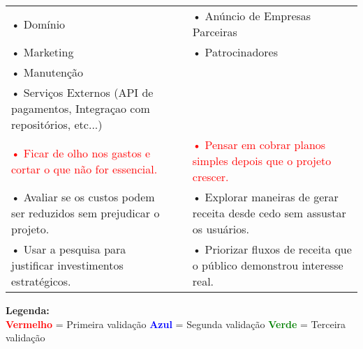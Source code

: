 \documentclass{article}
\begin{document}
\begin{table}[h!]
\begin{tabular}{|p{6cm}|p{6cm}|p{6cm}|}
• Domínio & & • Anúncio de Empresas Parceiras \\
• Marketing & & • Patrocinadores \\
• Manutenção & & \\
• Serviços Externos (API de pagamentos, Integraçao com repositórios, etc...) & & \\
\textcolor{red}{• Ficar de olho nos gastos e cortar o que não for essencial.} &
&
\textcolor{red}{• Pensar em cobrar planos simples depois que o projeto crescer.} \\
\textcolor{blueval}{• Avaliar se os custos podem ser reduzidos sem prejudicar o projeto.} &
&
\textcolor{blueval}{• Explorar maneiras de gerar receita desde cedo sem assustar os usuários.} \\
\textcolor{greenval}{• Usar a pesquisa para justificar investimentos estratégicos.} &
&
\textcolor{greenval}{• Priorizar fluxos de receita que o público demonstrou interesse real.} \\
\hline
\end{tabular}

\begin{center}
\textbf{Legenda:} \\
\textcolor{red}{\textbf{Vermelho}} = Primeira validação \quad
\textcolor{blue}{\textbf{Azul}} = Segunda validação \quad
\textcolor{green}{\textbf{Verde}} = Terceira validação
\end{center}

\end{table}
\end{document}
